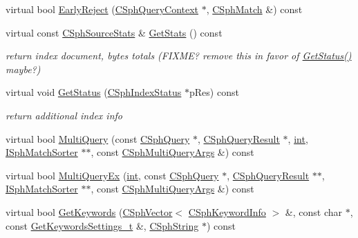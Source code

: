 \begin{DoxyCompactItemize}
virtual bool \hyperlink{classCSphDummyIndex_a4ae5289218066268d997f6aa84b3ac04}{Early\-Reject} (\hyperlink{classCSphQueryContext}{C\-Sph\-Query\-Context} $\ast$, \hyperlink{classCSphMatch}{C\-Sph\-Match} \&) const 
\item 
virtual const \hyperlink{structCSphSourceStats}{C\-Sph\-Source\-Stats} \& \hyperlink{classCSphDummyIndex_ad23f5de63b16480df3c7ef4e4cae8d7b}{Get\-Stats} () const 
\begin{DoxyCompactList}\small\item\em return index document, bytes totals (F\-I\-X\-M\-E? remove this in favor of \hyperlink{classCSphDummyIndex_ab12bbde4125ee6d5f5ea31c096a898ba}{Get\-Status()} maybe?) \end{DoxyCompactList}\item 
virtual void \hyperlink{classCSphDummyIndex_ab12bbde4125ee6d5f5ea31c096a898ba}{Get\-Status} (\hyperlink{structCSphIndexStatus}{C\-Sph\-Index\-Status} $\ast$p\-Res) const 
\begin{DoxyCompactList}\small\item\em return additional index info \end{DoxyCompactList}\item 
virtual bool \hyperlink{classCSphDummyIndex_a9d4dd68f75d918fc50346eae96583d1d}{Multi\-Query} (const \hyperlink{classCSphQuery}{C\-Sph\-Query} $\ast$, \hyperlink{classCSphQueryResult}{C\-Sph\-Query\-Result} $\ast$, \hyperlink{sphinxexpr_8cpp_a4a26e8f9cb8b736e0c4cbf4d16de985e}{int}, \hyperlink{classISphMatchSorter}{I\-Sph\-Match\-Sorter} $\ast$$\ast$, const \hyperlink{structCSphMultiQueryArgs}{C\-Sph\-Multi\-Query\-Args} \&) const 
\item 
virtual bool \hyperlink{classCSphDummyIndex_ac73bb80d3299c9a4568a0e926b2353d4}{Multi\-Query\-Ex} (\hyperlink{sphinxexpr_8cpp_a4a26e8f9cb8b736e0c4cbf4d16de985e}{int}, const \hyperlink{classCSphQuery}{C\-Sph\-Query} $\ast$, \hyperlink{classCSphQueryResult}{C\-Sph\-Query\-Result} $\ast$$\ast$, \hyperlink{classISphMatchSorter}{I\-Sph\-Match\-Sorter} $\ast$$\ast$, const \hyperlink{structCSphMultiQueryArgs}{C\-Sph\-Multi\-Query\-Args} \&) const 
\item 
virtual bool \hyperlink{classCSphDummyIndex_a13756ca3a40efcf81dafdeab1d69ee7b}{Get\-Keywords} (\hyperlink{classCSphVector}{C\-Sph\-Vector}$<$ \hyperlink{structCSphKeywordInfo}{C\-Sph\-Keyword\-Info} $>$ \&, const char $\ast$, const \hyperlink{structGetKeywordsSettings__t}{Get\-Keywords\-Settings\-\_\-t} \&, \hyperlink{structCSphString}{C\-Sph\-String} $\ast$) const 
\item 
$$
\end{DoxyCompactItemize}
